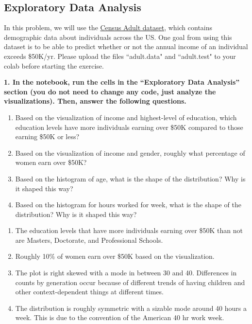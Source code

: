 \documentclass{article}
\begin{document}
\subsection*{Exploratory Data Analysis}

In this problem, we will use the \href{https://archive.ics.uci.edu/dataset/2/adult}{Census Adult dataset}, which contains demographic data about individuals across the US. One goal from using this dataset is to be able to predict whether or not the annual income of an individual exceeds \$50K/yr. Please upload the files ``adult.data" and ``adult.test" to your colab before starting the exercise. 

\textbf{1. In the notebook, run the cells in the ``Exploratory Data Analysis'' section (you do not need to change any code, just analyze the visualizations). Then, answer the following questions.}
\begin{enumerate}[label=\Alph*.]
\item Based on the visualization of income and highest-level of education, which education levels have more individuals earning over \$50K compared to those earning \$50K or less?
\item Based on the visualization of income and gender, roughly what percentage of women earn over \$50K?
\item Based on the histogram of age, what is the shape of the distribution? Why is it shaped this way?
\item Based on the histogram for hours worked for week, what is the shape of the distribution? Why is it shaped this way? 
\end{enumerate}

\bigskip

\begin{mdframed}
\begin{enumerate}[label=\Alph*.]
\item The education levels that have more individuals earning over \$50K than not are Masters, Doctorate, and Professional Schools.
\item Roughly 10\% of women earn over \$50K based on the visualization.
\item The plot is right skewed with a mode in between 30 and 40. Differences in counts by generation occur because of different trends of having children and other context-dependent things at different times.
\item The distribution is roughly symmetric with a sizable mode around 40 hours a week. This is due to the convention of the American 40 hr work week.
\end{enumerate}
\end{mdframed}
\end{document}
